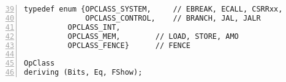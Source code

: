 {\small
\begin{Verbatim}[frame=single, numbers=left, firstnumber=39, label=src\_Common/Inter\_Stage.bsv]
typedef enum {OPCLASS_SYSTEM,     // EBREAK, ECALL, CSRRxx,
              OPCLASS_CONTROL,    // BRANCH, JAL, JALR
	      OPCLASS_INT,
	      OPCLASS_MEM,        // LOAD, STORE, AMO
	      OPCLASS_FENCE}      // FENCE

OpClass
deriving (Bits, Eq, FShow);
\end{Verbatim}
}
